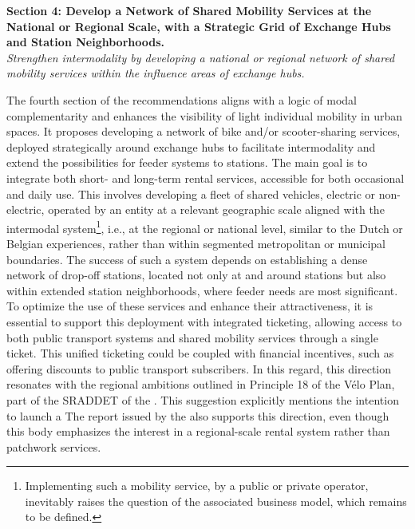 \begin{refsegment}
    \begin{displayquote}
\textbf{Section 4: Develop a Network of Shared Mobility Services at the National or Regional Scale, with a Strategic Grid of Exchange Hubs and Station Neighborhoods.}
\\
\textsl{Strengthen intermodality by developing a national or regional network of shared mobility services within the influence areas of exchange hubs.}
    \end{displayquote}
The fourth section of the recommendations aligns with a logic of modal complementarity and enhances the visibility of light individual mobility in urban spaces. It proposes developing a network of bike and/or scooter-sharing services, deployed strategically around exchange hubs to facilitate intermodality and extend the possibilities for feeder systems to stations. The main goal is to integrate both short- and long-term rental services, accessible for both occasional and daily use. This involves developing a fleet of shared vehicles, electric or non-electric, operated by an entity at a relevant geographic scale aligned with the intermodal system\footnote{
    Implementing such a mobility service, by a public or private operator, inevitably raises the question of the associated business model, which remains to be defined.
}, i.e., at the regional or national level, similar to the Dutch or Belgian experiences, rather than within segmented metropolitan or municipal boundaries. The success of such a system depends on establishing a dense network of drop-off stations, located not only at and around stations but also within extended station neighborhoods, where feeder needs are most significant. To optimize the use of these services and enhance their attractiveness, it is essential to support this deployment with integrated ticketing, allowing access to both public transport systems and shared mobility services through a single ticket. This unified ticketing could be coupled with financial incentives, such as offering discounts to public transport subscribers. In this regard, this direction resonates with the regional ambitions outlined in Principle 18 of the Vélo Plan, part of the \acrfull{SRADDET} of the \textcolor{blue}{\textcite[40]{region_hauts-de-france_plan_2023}}. This suggestion explicitly mentions the intention to launch a  The report issued by the \textcolor{blue}{\textcite[75]{ceser_hauts-de-france_mobilite_2021}} also supports this direction, even though this body emphasizes the interest in a regional-scale rental system rather than patchwork services.%


\end{refsegment}
